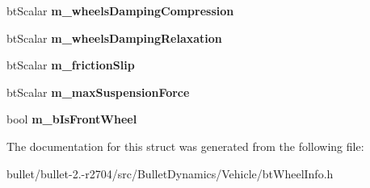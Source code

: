 \begin{DoxyCompactItemize}
\item 
\hypertarget{structbt_wheel_info_construction_info_a5b277a9060b3a47d93eb09321c62dce2}{bt\+Scalar {\bfseries m\+\_\+wheels\+Damping\+Compression}}\label{structbt_wheel_info_construction_info_a5b277a9060b3a47d93eb09321c62dce2}

\item 
\hypertarget{structbt_wheel_info_construction_info_a136b8c0f9f9833ef2ac7fc9c7d0f3ba8}{bt\+Scalar {\bfseries m\+\_\+wheels\+Damping\+Relaxation}}\label{structbt_wheel_info_construction_info_a136b8c0f9f9833ef2ac7fc9c7d0f3ba8}

\item 
\hypertarget{structbt_wheel_info_construction_info_a61c12acb2dccbc0c75952b0ffa454c56}{bt\+Scalar {\bfseries m\+\_\+friction\+Slip}}\label{structbt_wheel_info_construction_info_a61c12acb2dccbc0c75952b0ffa454c56}

\item 
\hypertarget{structbt_wheel_info_construction_info_a6396b75a9bd205c6aead692cdba2a316}{bt\+Scalar {\bfseries m\+\_\+max\+Suspension\+Force}}\label{structbt_wheel_info_construction_info_a6396b75a9bd205c6aead692cdba2a316}

\item 
\hypertarget{structbt_wheel_info_construction_info_a4cf8c234ad9f54fbc8a9acb6ac61adcb}{bool {\bfseries m\+\_\+b\+Is\+Front\+Wheel}}\label{structbt_wheel_info_construction_info_a4cf8c234ad9f54fbc8a9acb6ac61adcb}

\end{DoxyCompactItemize}


The documentation for this struct was generated from the following file\+:\begin{DoxyCompactItemize}
\item 
bullet/bullet-\/2.-\/r2704/src/\+Bullet\+Dynamics/\+Vehicle/bt\+Wheel\+Info.\+h\end{DoxyCompactItemize}

